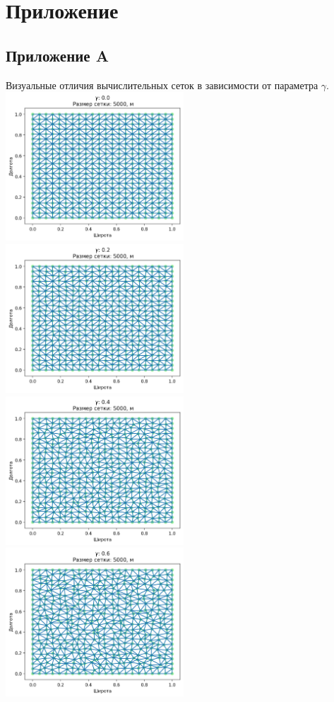 \newpage
\section*{\LARGE{Приложение}}
\label{appendix}
\subsection*{\LARGE{Приложение A}}
\label{appendix:meshes}
Визуальные отличия вычислительных сеток в зависимости от параметра $\gamma$.
\includegraphics[width=0.5\textwidth]{images/app1_1.png}
\includegraphics[width=0.5\textwidth]{images/app1_2.png}
\includegraphics[width=0.5\textwidth]{images/app1_3.png}
\includegraphics[width=0.5\textwidth]{images/app1_4.png}
